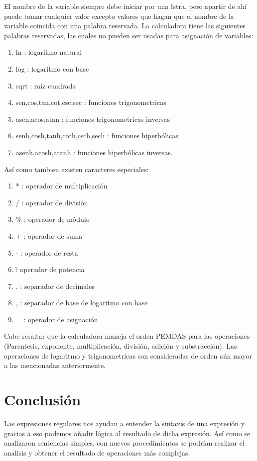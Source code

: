 \documentclass[10pt]{report}
\begin{document}
El nombre de la variable siempre debe iniciar por una letra, pero apartir de ahí puede tomar cualquier valor excepto valores que hagan que el nombre de la variable coincida con una palabra reservada. La calculadora tiene las siguientes palabras reservadas, las cuales no pueden ser usadas para asignación de variables:
\begin{enumerate}
    \item ln : logaritmo natural
    \item log : logaritmo con base
    \item sqrt : raíz cuadrada
    \item sen,cos,tan,cot,csc,sec : funciones trigonometricas
    \item asen,acos,atan : funciones trigonometricas inversas
    \item senh,cosh,tanh,coth,csch,sech : funciones hiperbólicas
    \item asenh,acosh,atanh : funciones hiperbólicas inversas.
\end{enumerate}
Así como tambien existen caracteres especiales:
\begin{enumerate}
    \item * : operador de multiplicación
    \item / : operador de división
    \item \% : operador de módulo
    \item + : operador de suma
    \item - : operador de resta
    \item \^ : operador de potencia
    \item . : separador de decimales
    \item , : separador de base de logaritmo con base
    \item = : operador de asignación
\end{enumerate}
Cabe resaltar que la calculadora maneja el orden PEMDAS para las operaciones (Parentesis, exponente, multiplicación, división, adición y substracción). Las operaciones de logaritmo y trigonometricas son consideradas de orden aún mayor a las mencionadas anteriormente.

\section*{Conclusión}
Las expresiones regulares nos ayudan a entender la sintaxis de una expresión y gracias a eso podemos añadir lógica al resultado de dicha expresión. Así como se analizaron sentencias simples, con nuevos procedimientos se podrían realizar el analisis y obtener el resultado de operaciones más complejas. 
\end{document}
